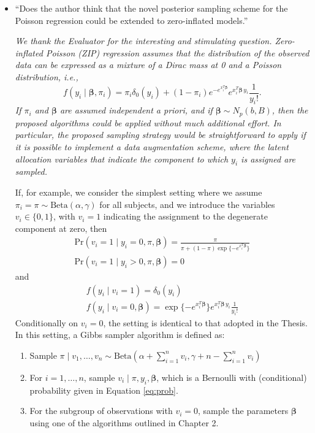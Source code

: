 \documentclass[11pt]{letter}
\begin{document}
\begin{itemize}
%
\item ``Does the author think that the novel posterior sampling scheme for the Poisson regression could be extended to zero-inflated models.''\vskip1mm

{\em
	We thank the Evaluator for the interesting and stimulating question.
	Zero-inflated Poisson (ZIP) regression assumes that the distribution of the observed data can be expressed as a mixture of a Dirac mass at 0 and a Poisson distribution, i.e.,
	$$ f(y_i \mid \bm{\beta}, \pi_i) = \pi_i \delta_0(y_i) + (1-\pi_i) e^{-e^{x_i^T\bm{\beta}}} e^{x_i^T\bm{\beta}\, y_i} \frac{1}{y_i!}.$$
	If $\pi_i$ and $\bm{\beta}$ are assumed independent a priori, and if $\bm{\beta} \sim N_p(b,B)$, then the proposed algorithms could be applied without much additional effort.
	In particular, the proposed sampling strategy would be straightforward to apply if it is possible to implement a data augmentation scheme, where the latent allocation variables that indicate the component to which $y_i$ is assigned are sampled. 
	
	If, for example, we consider the simplest setting where we assume $\pi_i = \pi \sim \mathrm{Beta}(\alpha,\gamma)$ for all subjects, and we introduce the variables $v_i\in\{0,1\}$, with $v_i = 1$ indicating the assignment to the degenerate component at zero, then
	\begin{equation}
	\begin{gathered}
	\mathrm{Pr}(v_i = 1 \mid y_i=0, \pi, \bm{\beta}) =  \frac{\pi}{\pi + (1-\pi) \exp\{-e^{x_i^T\bm{\beta}}\}} \\
	\mathrm{Pr}(v_i = 1 \mid y_i>0, \pi, \bm{\beta}) =  0
	\end{gathered}
	\label{eq:prob}
	\end{equation}
	and
	\begin{equation*}
	\begin{gathered}
		f(y_i \mid v_i = 1) = \delta_0(y_i) \\
		f(y_i \mid v_i = 0, \bm{\beta}) = \exp\{-e^{x_i^T\bm{\beta}}\}e^{x_i^T\bm{\beta}\, y_i}\frac{1}{y_i!}
	\end{gathered}
	\end{equation*}
	Conditionally on $v_i = 0$, the setting is identical to that adopted in the Thesis.\\
	In this setting, a Gibbs sampler algorithm is defined as:
	\begin{enumerate}
		\item Sample $\pi\mid v_1,\dots,v_n \sim \mathrm{Beta}(\alpha + \sum_{i=1}^{n} v_i, \gamma + n - \sum_{i=1}^{n} v_i)$
		\item For $i = 1,\dots,n$, sample $v_i\mid \pi, y_i, \bm{\beta}$, which is a Bernoulli with (conditional) probability given in Equation \eqref{eq:prob}.
		\item For the subgroup of observations with $v_i = 0$, sample the parameters $\bm{\beta}$ using one of the algorithms outlined in Chapter 2. 
		

\end{enumerate}}
\end{itemize}
\end{document}
